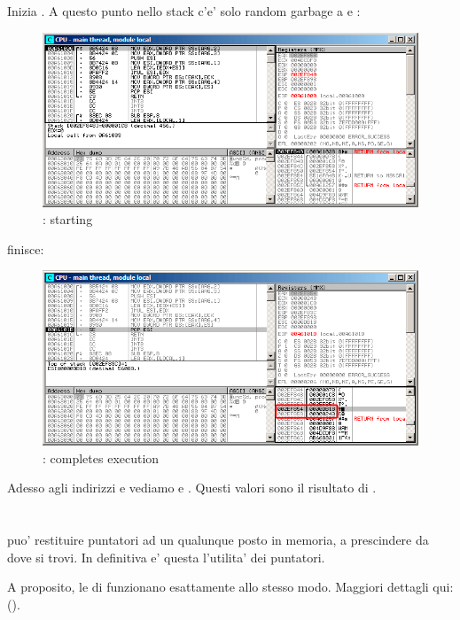 \clearpage
Inizia \ttfone.
A questo punto nello stack c'e' solo random garbage a  e  :

\begin{figure}[H]
\centering
\includegraphics[scale=\FigScale]{patterns/061_pointers/olly_stk2.png}
\caption{\olly: \ttfone starting}
\label{fig:pointers_olly_stk_2}
\end{figure}

\clearpage
\ttfone finisce:

\begin{figure}[H]
\centering
\includegraphics[scale=\FigScale]{patterns/061_pointers/olly_stk3.png}
\caption{\olly: \ttfone completes execution}
\label{fig:pointers_olly_stk_3}
\end{figure}

Adesso agli indirizzi  e  vediamo  e .
Questi valori sono il risultato di \ttfone.

\section{\Conclusione{}}
 
\ttfone puo' restituire puntatori ad un qualunque posto in memoria, a prescindere da dove si trovi.
In definitiva e' questa l'utilita' dei puntatori.

A proposito, le  di \Cpp funzionano esattamente allo stesso modo.
Maggiori dettagli qui: ().
